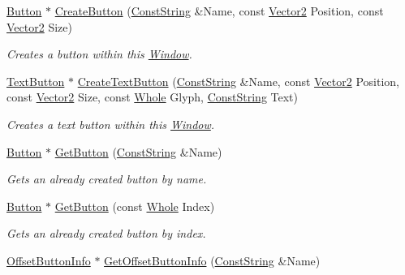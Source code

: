 \begin{DoxyCompactItemize}
\hyperlink{classphys_1_1UI_1_1Button}{Button} $\ast$ \hyperlink{classphys_1_1UI_1_1Window_a5414660c47246997cd1ed9654847055b}{CreateButton} (\hyperlink{namespacephys_a5ce5049f8b4bf88d6413c47b504ebb31}{ConstString} \&Name, const \hyperlink{classphys_1_1Vector2}{Vector2} Position, const \hyperlink{classphys_1_1Vector2}{Vector2} Size)
\begin{DoxyCompactList}\small\item\em Creates a button within this \hyperlink{classphys_1_1UI_1_1Window}{Window}. \item\end{DoxyCompactList}\item 
\hyperlink{classphys_1_1UI_1_1TextButton}{TextButton} $\ast$ \hyperlink{classphys_1_1UI_1_1Window_a4852c7abd3ce842a424ae0621b70df34}{CreateTextButton} (\hyperlink{namespacephys_a5ce5049f8b4bf88d6413c47b504ebb31}{ConstString} \&Name, const \hyperlink{classphys_1_1Vector2}{Vector2} Position, const \hyperlink{classphys_1_1Vector2}{Vector2} Size, const \hyperlink{namespacephys_a460f6bc24c8dd347b05e0366ae34f34a}{Whole} Glyph, \hyperlink{namespacephys_a5ce5049f8b4bf88d6413c47b504ebb31}{ConstString} Text)
\begin{DoxyCompactList}\small\item\em Creates a text button within this \hyperlink{classphys_1_1UI_1_1Window}{Window}. \item\end{DoxyCompactList}\item 
\hyperlink{classphys_1_1UI_1_1Button}{Button} $\ast$ \hyperlink{classphys_1_1UI_1_1Window_ab1152992cf6b636c8a4911889d930d9a}{GetButton} (\hyperlink{namespacephys_a5ce5049f8b4bf88d6413c47b504ebb31}{ConstString} \&Name)
\begin{DoxyCompactList}\small\item\em Gets an already created button by name. \item\end{DoxyCompactList}\item 
\hyperlink{classphys_1_1UI_1_1Button}{Button} $\ast$ \hyperlink{classphys_1_1UI_1_1Window_a1ec54b75619613e173509bd4d5533171}{GetButton} (const \hyperlink{namespacephys_a460f6bc24c8dd347b05e0366ae34f34a}{Whole} Index)
\begin{DoxyCompactList}\small\item\em Gets an already created button by index. \item\end{DoxyCompactList}\item 
\hyperlink{structphys_1_1UI_1_1ResizingInfo}{OffsetButtonInfo} $\ast$ \hyperlink{classphys_1_1UI_1_1Window_ad0d6b12c2f69ea1bc580bba7e69949a5}{GetOffsetButtonInfo} (\hyperlink{namespacephys_a5ce5049f8b4bf88d6413c47b504ebb31}{ConstString} \&Name)

\end{DoxyCompactItemize}
